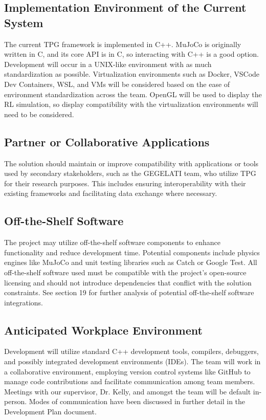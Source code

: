 \documentclass[12pt]{article}
\begin{document}
\subsection{Implementation Environment of the Current System}
The current TPG framework is implemented in C++. MuJoCo is originally written in C, and its core API is in C, so interacting with C++ is a good option. Development will occur in a UNIX-like environment with as much standardization as possible. Virtualization environments such as Docker, VSCode Dev Containers, WSL, and VMs will be considered based on the ease of environment standardization across the team. OpenGL will be used to display the RL simulation, so display compatibility with the virtualization environments will need to be considered.

\subsection{Partner or Collaborative Applications}
The solution should maintain or improve compatibility with applications or tools used by secondary stakeholders, such as the GEGELATI team, who utilize TPG for their research purposes. This includes ensuring interoperability with their existing frameworks and facilitating data exchange where necessary.

\subsection{Off-the-Shelf Software}
The project may utilize off-the-shelf software components to enhance functionality and reduce development time. Potential components include physics engines like MuJoCo and unit testing libraries such as Catch or Google Test. All off-the-shelf software used must be compatible with the project's open-source licensing and should not introduce dependencies that conflict with the solution constraints. See section 19 for further analysis of potential off-the-shelf software integrations.

\subsection{Anticipated Workplace Environment}
Development will utilize standard C++ development tools, compilers, debuggers, and possibly integrated development environments (IDEs). The team will work in a collaborative environment, employing version control systems like GitHub to manage code contributions and facilitate communication among team members. Meetings with our supervisor, Dr. Kelly, and amongst the team will be default in-person. Modes of communication have been discussed in further detail in the Development Plan document.
\end{document}
